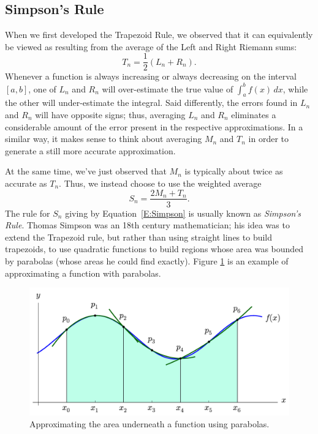\subsection*{Simpson's Rule}   %

When we first developed the Trapezoid Rule, we observed that it can equivalently be viewed as resulting from the average of the Left and Right Riemann sums:
$$T_n = \frac{1}{2}(L_n + R_n).$$
Whenever a function is always increasing or always decreasing on the interval $[a,b]$, one of $L_n$ and $R_n$ will over-estimate the true value of $\int_a^b f(x) \, dx$, while the other will under-estimate the integral.  Said differently, the errors found in $L_n$ and $R_n$ will have opposite signs; thus, averaging $L_n$ and $R_n$ eliminates a considerable amount of the error present in the respective approximations.  In a similar way, it makes sense to think about averaging $M_n$ and $T_n$ in order to generate a still more accurate approximation.

At the same time, we've just observed that $M_n$ is typically about twice as accurate as $T_n$.  Thus, we instead choose to use the weighted average 
\begin{equation} \label{E:Simpson}
S_n = \frac{2M_n + T_n}{3}.
\end{equation}
The rule for $S_n$ giving by Equation~\ref{E:Simpson} is usually known as \emph{Simpson's Rule}. Thomas Simpson was an 18th century mathematician; his idea was to extend the Trapezoid rule, but rather than using straight lines to build trapezoids, to use quadratic functions to build regions whose area was bounded by parabolas (whose areas he could find exactly). Figure \ref{F:5.6.simpson} is an example of approximating a function with parabolas. 

\begin{figure} %
\includegraphics[width=\textwidth]{figs/5/simpson.pdf}
\caption{Approximating the area underneath a function using parabolas.}
\label{F:5.6.simpson}
\end{figure}

